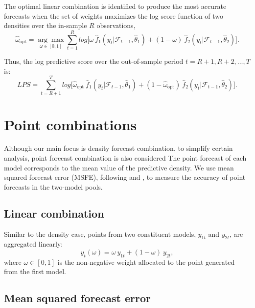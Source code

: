\documentclass{monashthesis}
\begin{document}
The optimal linear combination is identified to produce the most accurate forecasts when the set of weights maximizes the log score function of two densities over the in-sample \(R\) observations,
\begin{equation}
\label{eqn:LS2}
\hat{\omega}_{\text{opt}} =  \underset{\omega \in [0,1]}{\arg\max} \sum^R_{t=1} log \Big[ \omega \ \hat f_1(y_t| \mathcal{F}_{t-1}, \hat\theta_{1}) + (1-\omega) \ \hat f_2(y_t| \mathcal{F}_{t-1}, \hat\theta_{2})\Big].
\end{equation}

Thus, the log predictive score over the out-of-sample period \(t = R+1, R+2, \dots, T\) is:
\begin{equation}
\label{eqn:LS3}
LPS = \sum^T_{t = R+1} log \Big[ \hat{\omega}_{\text{opt}} \ \hat f_1(y_t| \mathcal{F}_{t-1}, \hat\theta_{1}) + (1- \hat{\omega}_{\text{opt}}) \ \hat f_2(y_t| \mathcal{F}_{t-1}, \hat\theta_{2})\Big].
\end{equation}

\vspace{1cm}

\hypertarget{point-combinations}{%
\section{Point combinations}\label{point-combinations}}

Although our main focus is density forecast combination, to simplify certain analysis, point forecast combination is also considered The point forecast of each model corresponds to the mean value of the predictive density. We use mean squared forecast error (MSFE), following \textcite{BG69} and \textcite{SW09}, to measure the accuracy of point forecasts in the two-model pools.

\subsection*{Linear combination}

Similar to the density case, points from two constituent models, \(y_{1t}\) and \(y_{2t}\), are aggregated linearly:
\begin{equation*}
y_t({\omega}) = \omega \ y_{1t} + (1-\omega) \ y_{2t},
\end{equation*}
where \(\omega\in [0,1]\) is the non-negative weight allocated to the point generated from the first model.

\subsection*{Mean squared forecast error}
\end{document}
